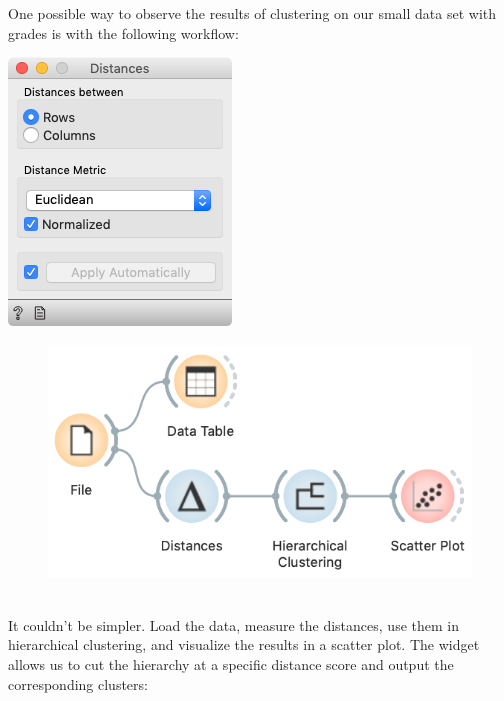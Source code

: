 \clearpage

One possible way to observe the results of clustering on our small data set with grades is with the following workflow:

\begin{marginfigure}
    \centering
    \includegraphics[scale=0.6]{distances.png}
\end{marginfigure}

\begin{figure}[h]
    \centering
    \includegraphics[scale=0.4]{workflow_clustering.png}
    \caption{$\;$} %
\end{figure}

It couldn’t be simpler. Load the data, measure the distances, use them in hierarchical clustering, and visualize the results in a scatter plot. The  widget allows us to cut the hierarchy at a specific distance score and output the corresponding clusters:


